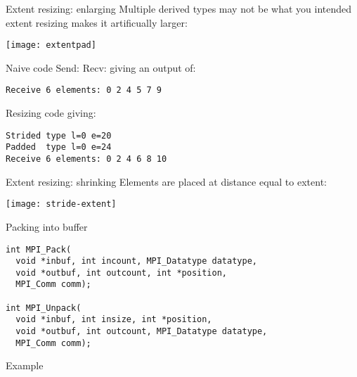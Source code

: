 \begin{numberedframe}{Extent resizing: enlarging}
  Multiple derived types may not be what you intended\\
  extent resizing makes it artificually larger:

  \texttt{[image: extentpad]}  
\end{numberedframe}

\begin{numberedframe}{Naive code}
  Send:
  Recv:
giving an output of:
\begin{verbatim}
Receive 6 elements: 0 2 4 5 7 9
\end{verbatim}
\end{numberedframe}

\begin{numberedframe}{Resizing code}
giving:
\begin{verbatim}
Strided type l=0 e=20
Padded  type l=0 e=24
Receive 6 elements: 0 2 4 6 8 10
\end{verbatim}
\end{numberedframe}

\begin{numberedframe}{Extent resizing: shrinking}
  Elements are placed at distance equal to extent:

  \texttt{[image: stride-extent]}
\end{numberedframe}

\begin{exerciseframe}[stridesend]
 
\end{exerciseframe}


\begin{numberedframe}{Packing into buffer}
\lstset{language=C}
\begin{lstlisting}
int MPI_Pack(
  void *inbuf, int incount, MPI_Datatype datatype,
  void *outbuf, int outcount, int *position,
  MPI_Comm comm);

int MPI_Unpack(
  void *inbuf, int insize, int *position,
  void *outbuf, int outcount, MPI_Datatype datatype,
  MPI_Comm comm);
\end{lstlisting}
\end{numberedframe}

\begin{numberedframe}{Example}
\small
{}
\end{numberedframe}

